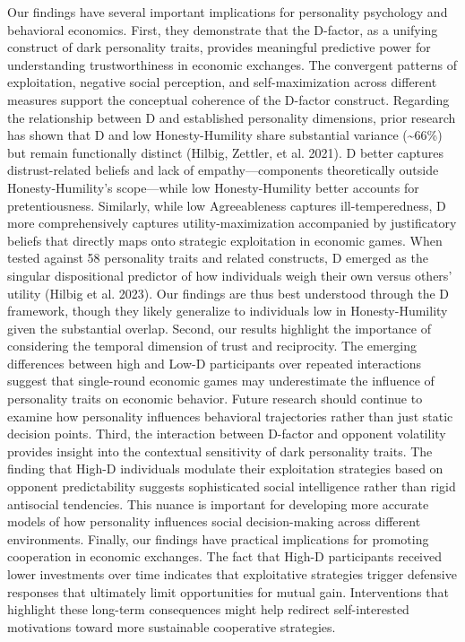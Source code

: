\documentclass[
]{article}
\begin{document}
Our findings have several important implications for personality psychology and behavioral economics.
First, they demonstrate that the D-factor, as a unifying construct of dark personality traits, provides meaningful predictive power for understanding trustworthiness in economic exchanges.
The convergent patterns of exploitation, negative social perception, and self-maximization across different measures support the conceptual coherence of the D-factor construct.
Regarding the relationship between D and established personality dimensions, prior research has shown that D and low Honesty-Humility share substantial variance (\textasciitilde66\%) but remain functionally distinct (Hilbig, Zettler, et al. 2021). D better captures distrust-related beliefs and lack of empathy---components theoretically outside Honesty-Humility's scope---while low Honesty-Humility better accounts for pretentiousness. Similarly, while low Agreeableness captures ill-temperedness, D more comprehensively captures utility-maximization accompanied by justificatory beliefs that directly maps onto strategic exploitation in economic games. When tested against 58 personality traits and related constructs, D emerged as the singular dispositional predictor of how individuals weigh their own versus others' utility (Hilbig et al. 2023). Our findings are thus best understood through the D framework, though they likely generalize to individuals low in Honesty-Humility given the substantial overlap.
Second, our results highlight the importance of considering the temporal dimension of trust and reciprocity.
The emerging differences between high and Low-D participants over repeated interactions suggest that single-round economic games may underestimate the influence of personality traits on economic behavior.
Future research should continue to examine how personality influences behavioral trajectories rather than just static decision points.
Third, the interaction between D-factor and opponent volatility provides insight into the contextual sensitivity of dark personality traits.
The finding that High-D individuals modulate their exploitation strategies based on opponent predictability suggests sophisticated social intelligence rather than rigid antisocial tendencies.
This nuance is important for developing more accurate models of how personality influences social decision-making across different environments.
Finally, our findings have practical implications for promoting cooperation in economic exchanges.
The fact that High-D participants received lower investments over time indicates that exploitative strategies trigger defensive responses that ultimately limit opportunities for mutual gain.
Interventions that highlight these long-term consequences might help redirect self-interested motivations toward more sustainable cooperative strategies.
\end{document}
